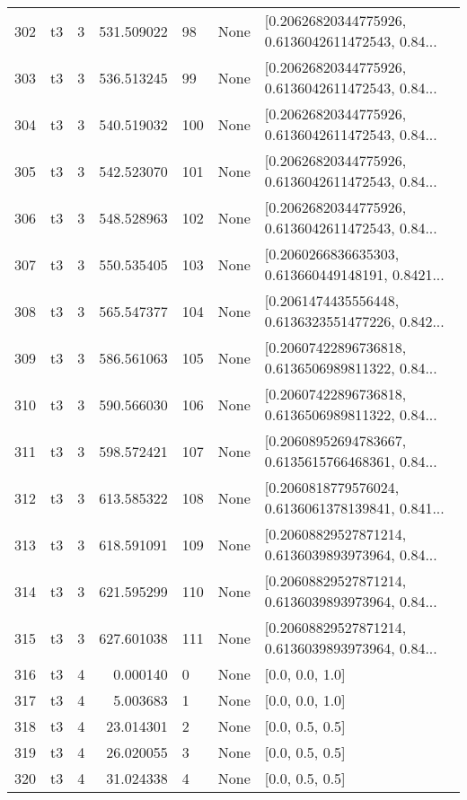 \begin{tabular}{lllrlll}
302 &  t3 &   3 &  531.509022 &   98 &  None &  [0.20626820344775926, 0.6136042611472543, 0.84... \\
303 &  t3 &   3 &  536.513245 &   99 &  None &  [0.20626820344775926, 0.6136042611472543, 0.84... \\
304 &  t3 &   3 &  540.519032 &  100 &  None &  [0.20626820344775926, 0.6136042611472543, 0.84... \\
305 &  t3 &   3 &  542.523070 &  101 &  None &  [0.20626820344775926, 0.6136042611472543, 0.84... \\
306 &  t3 &   3 &  548.528963 &  102 &  None &  [0.20626820344775926, 0.6136042611472543, 0.84... \\
307 &  t3 &   3 &  550.535405 &  103 &  None &  [0.2060266836635303, 0.613660449148191, 0.8421... \\
308 &  t3 &   3 &  565.547377 &  104 &  None &  [0.2061474435556448, 0.6136323551477226, 0.842... \\
309 &  t3 &   3 &  586.561063 &  105 &  None &  [0.20607422896736818, 0.6136506989811322, 0.84... \\
310 &  t3 &   3 &  590.566030 &  106 &  None &  [0.20607422896736818, 0.6136506989811322, 0.84... \\
311 &  t3 &   3 &  598.572421 &  107 &  None &  [0.20608952694783667, 0.6135615766468361, 0.84... \\
312 &  t3 &   3 &  613.585322 &  108 &  None &  [0.2060818779576024, 0.6136061378139841, 0.841... \\
313 &  t3 &   3 &  618.591091 &  109 &  None &  [0.20608829527871214, 0.6136039893973964, 0.84... \\
314 &  t3 &   3 &  621.595299 &  110 &  None &  [0.20608829527871214, 0.6136039893973964, 0.84... \\
315 &  t3 &   3 &  627.601038 &  111 &  None &  [0.20608829527871214, 0.6136039893973964, 0.84... \\
316 &  t3 &   4 &    0.000140 &    0 &  None &                                    [0.0, 0.0, 1.0] \\
317 &  t3 &   4 &    5.003683 &    1 &  None &                                    [0.0, 0.0, 1.0] \\
318 &  t3 &   4 &   23.014301 &    2 &  None &                                    [0.0, 0.5, 0.5] \\
319 &  t3 &   4 &   26.020055 &    3 &  None &                                    [0.0, 0.5, 0.5] \\
320 &  t3 &   4 &   31.024338 &    4 &  None &                                    [0.0, 0.5, 0.5] \\

\end{tabular}
